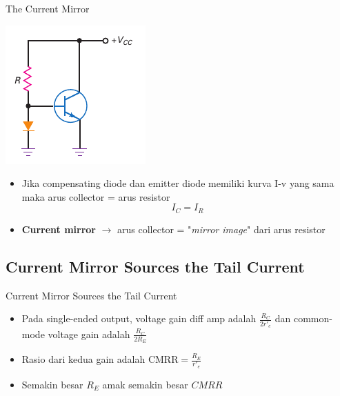 \documentclass[aspectratio=169]{beamer}
\begin{document}
\begin{frame}{The Current Mirror}
	\begin{multicols}{2}
		\begin{center}
			\includegraphics[height=0.7\textheight]{gambar/01.diff-amp/01.fig28}
		\end{center}
		\columnbreak
		\begin{itemize}
			\item Jika compensating diode dan emitter diode memiliki kurva I-v yang sama maka arus collector = arus resistor
			\begin{equation}\label{pers.24}
				I_C = I_R
			\end{equation}
			\item \textbf{Current mirror} $ \rightarrow $ arus collector = "\textit{mirror image}" dari arus resistor
		\end{itemize}
	\end{multicols}
\end{frame}

\subsection{Current Mirror Sources the Tail Current}
\begin{frame}{Current Mirror Sources the Tail Current}
	\begin{itemize}
		\item Pada single-ended output, voltage gain diff amp adalah $ \frac{R_C}{2 r'_e} $ dan common-mode voltage gain adalah $ \frac{R_C}{2R_E} $
		\item Rasio dari kedua gain adalah $ \text{CMRR} = \frac{R_E}{r'_e}$
		\item Semakin besar $ R_E $ amak semakin besar $ CMRR $
	\end{itemize}
\end{frame}
\end{document}
